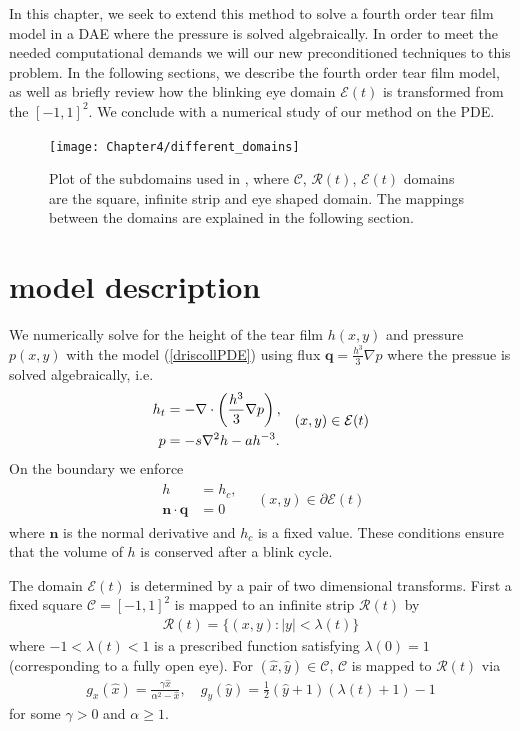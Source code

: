 In this chapter, we seek to extend this method to solve a fourth order tear film model in a DAE where the pressure is solved algebraically. In order to meet the needed computational demands we will our new preconditioned techniques to this problem. In the following sections, we describe the fourth order tear film model, as well as briefly review how the blinking eye domain $\mathcal{E}(t)$ is transformed from the $[-1,1]^2$. We conclude with a numerical study of our method on the PDE.


\begin{figure}
  \centering
  \texttt{[image: Chapter4/different\_domains]}
  \caption{Plot of the subdomains used in \cite{driscoll2018simulation}, where $\mathcal{C}$, $\mathcal{R}(t)$, $\mathcal{E}(t)$ domains are the square, infinite strip and eye shaped domain. The mappings between the domains are explained in the following section.}
  \label{driscoll_eye}
\end{figure}
	
\section{model description}

We numerically solve for the height of the tear film $h(x,y)$ and pressure $p(x,y)$ with the model (\ref{driscollPDE}) using flux $\bm{q} =  \frac{h^3}{3} \nabla p$ where the pressue is solved algebraically, i.e.
\begin{align}
\begin{aligned}
h_t &= - \nabla \cdot \left( \frac{h^3}{3} \nabla p \right), \\
p &= - s \nabla^2 h - a h^{-3}.
\end{aligned} \quad (x,y) \in \mathcal{E}(t)
\label{the_pde}
\end{align}
On the boundary we enforce
\begin{align}
\begin{aligned}
h &= h_{c}, \\
\bm{n} \cdot \bm{q} &=0
\end{aligned} \quad (x,y) \in \partial \mathcal{E}(t)
\label{boundary_conds}
\end{align}
where $\bm{n}$ is the normal derivative and $h_c$ is a fixed value. These conditions ensure that the volume of $h$ is conserved after a blink cycle.

The domain $\mathcal{E}(t)$ is determined by a pair of two dimensional transforms. First a fixed square $\mathcal{C}=[-1,1]^2$ is mapped to an infinite strip $\mathcal{R}(t)$ by
\begin{align}
\mathcal{R}(t) = \{(x,y):|y|<\lambda(t)\}	
\end{align}
where $-1<\lambda(t)<1$ is a prescribed function satisfying $\lambda(0)=1$ (corresponding to a fully open eye). For $(\hat{x},\hat{y}) \in \mathcal{C}$, $\mathcal{C}$ is mapped to $\mathcal{R}(t)$ via
\begin{align}
	g_x(\hat{x}) = \frac{\gamma \hat{x}}{\alpha^2 - \hat{x}}, \quad g_y(\hat{y}) = \frac{1}{2} (\hat{y}+1)(\lambda(t)+1)-1
\end{align}
for some $\gamma>0$ and $\alpha \geq 1$.



